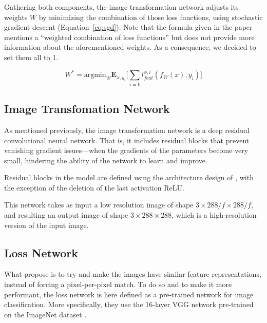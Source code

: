 \documentclass{article}
\begin{document}
{    \bigskip

    Gathering both components, the image transformation network adjusts its weights $W$ by minimizing the combination of those loss functions, using stochastic gradient descent (Equation~\ref{eq:sgd}). Note that the formula given in the paper \citep{sr} mentions a “weighted combination of loss functions” but does not provide more information about the aforementioned weights. As a consequence, we decided to set them all to 1.

    \begin{equation}
        W^* = \text{argmin}_W \textbf{E}_{x,y_i} \biggl[ \sum_{i=0} l^{\phi, i}_{feat}(f_W(x), y_i) \biggr]
        \label{eq:sgd}
    \end{equation}

    \subsection{Image Transfomation Network}
    \label{subsec:image-transformation-network-method}

    As mentioned previously, the image transformation network is a deep residual convolutional neural network. That is, it includes residual blocks that prevent vanishing gradient issues---when the gradients of the parameters become very small, hindering the ability of the network to learn and improve.
    
    Residual blocks in the model are defined using the architecture design of \cite{rb}, with the exception of the deletion of the last activation ReLU. 

    This network takes as input a low resolution image of shape $3 \times 288/f \times 288/f$, and resulting an output image of shape $3 \times 288 \times 288$, which is a high-resolution version of the input image.
    
    \subsection{Loss Network}
    \label{subsec:loss-network-method}

    What propose \cite{sr} is to try and make the images have similar feature representations, instead of forcing a pixel-per-pixel match. To do so and to make it more performant, the loss network is here defined as a pre-trained network for image classification. More specifically, they use the 16-layer VGG network \citep{vgg} pre-trained on the ImageNet dataset \citep{image-net}.

}
\end{document}
